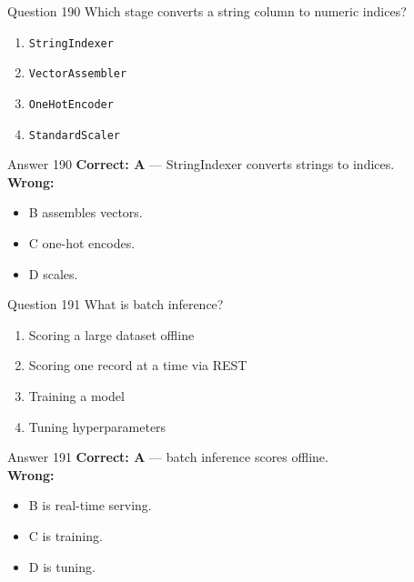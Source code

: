 \documentclass[aspectratio=169,11pt]{beamer}
\begin{document}
	\begin{frame}{Question 190}
		Which stage converts a string column to numeric indices?
		\begin{enumerate}[label=\Alph*.]
			\item \texttt{StringIndexer}
			\item \texttt{VectorAssembler}
			\item \texttt{OneHotEncoder}
			\item \texttt{StandardScaler}
		\end{enumerate}
	\end{frame}
	\begin{frame}{Answer 190}
		\textbf{Correct: A} --- StringIndexer converts strings to indices.\\
		\vspace{0.5em}
		\textbf{Wrong:}
		\begin{itemize}
			\item B assembles vectors.
			\item C one-hot encodes.
			\item D scales.
		\end{itemize}
	\end{frame}
	
	\begin{frame}{Question 191}
		What is batch inference?
		\begin{enumerate}[label=\Alph*.]
			\item Scoring a large dataset offline
			\item Scoring one record at a time via REST
			\item Training a model
			\item Tuning hyperparameters
		\end{enumerate}
	\end{frame}
	\begin{frame}{Answer 191}
		\textbf{Correct: A} --- batch inference scores offline.\\
		\vspace{0.5em}
		\textbf{Wrong:}
		\begin{itemize}
			\item B is real-time serving.
			\item C is training.
			\item D is tuning.
		\end{itemize}
	\end{frame}
	
\end{document}
